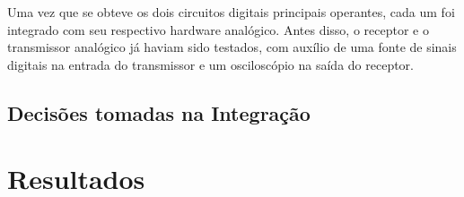 	Uma vez que se obteve os dois circuitos digitais principais operantes, cada um foi integrado com seu respectivo hardware analógico. Antes disso, o receptor e o transmissor analógico já haviam sido testados, com auxílio de uma fonte de sinais digitais na entrada do transmissor e um osciloscópio na saída do receptor.
	
	\subsection{Decisões tomadas na Integração}
	
	\section{Resultados}
	
